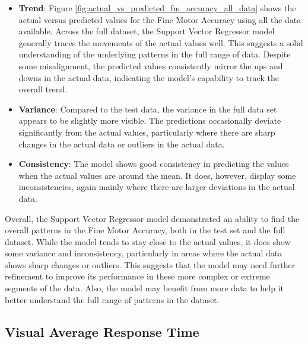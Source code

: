 \begin{itemize}
    \item \textbf{Trend}: Figure \ref{fig:actual_vs_predicted_fm_accuracy_all_data} shows the actual versus predicted values for the Fine Motor Accuracy using all the data available.
          Across the full dataset, the Support Vector Regressor model generally traces the movements of the actual values well. This suggests a solid understanding of the underlying patterns
          in the full range of data. Despite some misalignment, the predicted values consistently mirror the ups and downs in the actual data, indicating the model's capability to track the
          overall trend.
    \item \textbf{Variance}: Compared to the test data, the variance in the full data set appears to be slightly more visible. The predictions occasionally deviate significantly from the
          actual values, particularly where there are sharp changes in the actual data or outliers in the actual data.
    \item \textbf{Consistency}: The model shows good consistency in predicting the values when the actual values are around the mean. It does, however, display some inconsistencies, again
          mainly where there are larger deviations in the actual data.
\end{itemize}

Overall, the Support Vector Regressor model demonstrated an ability to find the overall patterns in the Fine Motor Accuracy, both in the test set and the full dataset. While the model tends
to stay close to the actual values, it does show some variance and inconsistency, particularly in areas where the actual data shows sharp changes or outliers. This suggests that the
model may need further refinement to improve its performance in these more complex or extreme segments of the data. Also, the model may benefit from more data to help it better understand
the full range of patterns in the dataset.

\subsection*{Visual Average Response Time}

